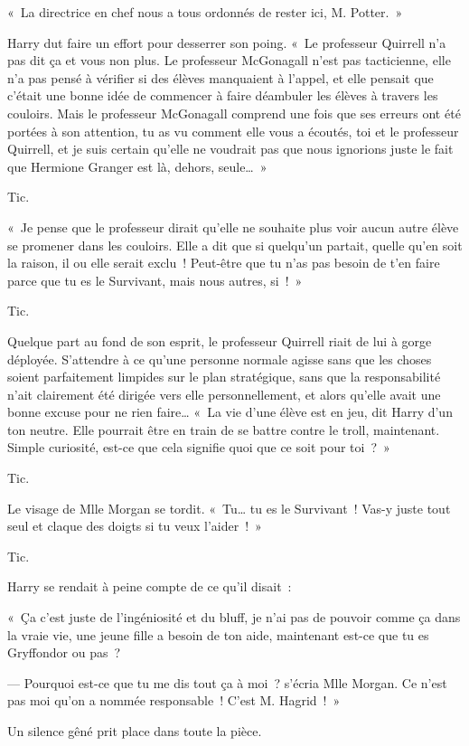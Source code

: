 «~La directrice en chef nous a tous ordonnés de rester ici, M. Potter.~»

Harry dut faire un effort pour desserrer son poing. «~Le professeur Quirrell n'a pas dit ça et vous non plus. Le professeur McGonagall n'est pas tacticienne, elle n'a pas pensé à vérifier si des élèves manquaient à l'appel, et elle pensait que c'était une bonne idée de commencer à faire déambuler les élèves à travers les couloirs. Mais le professeur McGonagall comprend une fois que ses erreurs ont été portées à son attention, tu as vu comment elle vous a écoutés, toi et le professeur Quirrell, et je suis certain qu'elle ne voudrait pas que nous ignorions juste le fait que Hermione Granger est là, dehors, seule…~»

Tic.

«~Je pense que le professeur dirait qu'elle ne souhaite plus voir aucun autre élève se promener dans les couloirs. Elle a dit que si quelqu'un partait, quelle qu'en soit la raison, il ou elle serait exclu~! Peut-être que tu n'as pas besoin de t'en faire parce que tu es le Survivant, mais nous autres, si~!~»

Tic.

Quelque part au fond de son esprit, le professeur Quirrell riait de lui à gorge déployée. S'attendre à ce qu'une personne normale agisse sans que les choses soient parfaitement limpides sur le plan stratégique, sans que la responsabilité n'ait clairement été dirigée vers elle personnellement, et alors qu'elle avait une bonne excuse pour ne rien faire… «~La vie d'une élève est en jeu, dit Harry d'un ton neutre. Elle pourrait être en train de se battre contre le troll, maintenant. Simple curiosité, est-ce que cela signifie quoi que ce soit pour toi~?~»

Tic.

Le visage de Mlle Morgan se tordit. «~Tu… tu es le Survivant~! Vas-y juste tout seul et claque des doigts si tu veux l'aider~!~»

Tic.

Harry se rendait à peine compte de ce qu'il disait~:

«~Ça c'est juste de l'ingéniosité et du bluff, je n'ai pas de pouvoir comme ça dans la vraie vie, une jeune fille a besoin de ton aide, maintenant est-ce que tu es Gryffondor ou pas~?

--- Pourquoi est-ce que tu me dis tout ça à moi~? s'écria Mlle Morgan. Ce n'est pas moi qu'on a nommée responsable~! C'est M. Hagrid~!~»

Un silence gêné prit place dans toute la pièce.

